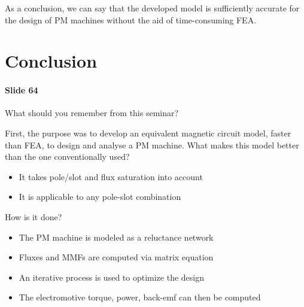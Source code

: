 As a conclusion, we can say that the developed model is sufficiently accurate for the design of PM machines without the aid of time-consuming FEA.

\section{Conclusion}
\paragraph{Slide 64} What should you remember from this seminar?

First, the purpose was to develop an equivalent magnetic circuit model, faster than FEA, to design and analyse a PM machine. 
What makes this model better than the one conventionally used?
\begin{itemize}
    \item It takes pole/slot and flux saturation into account
    \item It is applicable to any pole-slot combination
\end{itemize}
How is it done?
\begin{itemize}
    \item The PM machine is modeled as a reluctance network
    \item Fluxes and MMFs are computed via matrix equation
    \item An iterative process is used to optimize the design
    \item The electromotive torque, power, back-emf can then be computed
\end{itemize} 
